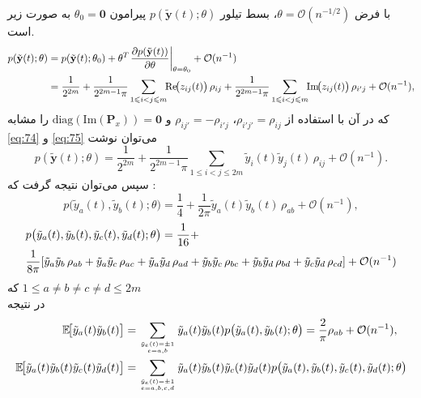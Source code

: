 \begin{اثبات}
	با فرض \(\theta=\mathcal{O}(n^{-1/2})\)، بسط تیلور \(p(\tilde{\mathbf{y}}(t);\theta)\) پیرامون \(\theta_{0}=\mathbf{0}\) به صورت زیر است.
	\begin{align}
		p(\tilde{\mathbf{y}}(t);\theta)
		&= p(\tilde{\mathbf{y}}(t);\theta_{0})
		+ \theta^{T}\!\left.\frac{\partial p(\tilde{\mathbf{y}}(t))}{\partial \theta}\right|_{\theta=\theta_{0}}
		+ \mathcal{O}(n^{-1}) \notag \\
		&= \frac{1}{2^{2m}}
		+ \frac{1}{2^{2m-1}\pi}\sum_{1\le i<j\le m}\!\!\mathrm{Re}\!\big(z_{ij}(t)\big)\,\rho_{ij}
		+ \frac{1}{2^{2m-1}\pi}\sum_{1\le i<j\le m}\!\!\mathrm{Im}\!\big(z_{ij}(t)\big)\,\rho_{i'j}
		+ \mathcal{O}(n^{-1}),
	\end{align}
	که در آن با استفاده از \(\rho_{i'j'}=\rho_{ij}\)، \(\rho_{ij'}=-\rho_{i'j}\) و \(\mathrm{diag}(\mathrm{Im}(\mathbf{P}_{x}))=\mathbf{0}\) را مشابه \eqref{eq:74} و \eqref{eq:75} می‌توان نوشت
	\begin{equation}
		p(\tilde{\mathbf{y}}(t);\theta)
		= \frac{1}{2^{2m}}
		+ \frac{1}{2^{2m-1}\pi}\sum_{1\le i<j\le 2m}\tilde y_i(t)\tilde y_j(t)\,\rho_{ij}
		+ \mathcal{O}(n^{-1}).
	\end{equation}
	سپس می‌توان نتیجه گرفت که :
	\begin{equation}
		p\big(\tilde y_a(t),\tilde y_b(t);\theta\big)
		= \frac{1}{4}+\frac{1}{2\pi}\tilde y_a(t)\tilde y_b(t)\,\rho_{ab}+\mathcal{O}(n^{-1}),
	\end{equation}
	\begin{align}
		&p\big(\tilde y_a(t),\tilde y_b(t),\tilde y_c(t),\tilde y_d(t);\theta\big)
		= \frac{1}{16}
		+ \notag \\
		&\frac{1}{8\pi}\!\left[
		\tilde y_a\tilde y_b\,\rho_{ab}+\tilde y_a\tilde y_c\,\rho_{ac}+\tilde y_a\tilde y_d\,\rho_{ad}
		+\tilde y_b\tilde y_c\,\rho_{bc}+\tilde y_b\tilde y_d\,\rho_{bd}+\tilde y_c\tilde y_d\,\rho_{cd}
		\right] +\mathcal{O}(n^{-1})
	\end{align}
	که 
	$1\leq a \neq b \neq c \neq d \leq 2m$ \\
	در نتیجه
	\begin{align}
		\mathbb{E}\!\big[\tilde y_a(t)\tilde y_b(t)\big]
		&= \sum_{\tilde{y}_e(t)=\pm1 \atop e=a,b} \tilde{y}_a(t)\tilde{y}_b(t)p\big(\tilde y_a(t),\tilde y_b(t);\theta\big)  = \frac{2}{\pi}\rho_{ab}+\mathcal{O}(n^{-1}),\\
		\mathbb{E}\!\big[\tilde y_a(t)\tilde y_b(t)\tilde y_c(t)\tilde y_d(t)\big]
		&=\sum_{\tilde{y}_e(t)=\pm1 \atop e=a,b,c,d} \tilde{y}_a(t)\tilde{y}_b(t)\tilde{y}_c(t)\tilde{y}_d(t)p\big(\tilde y_a(t),\tilde y_b(t),\tilde{y}_c(t),\tilde{y}_d(t);\theta\big) \notag \\

\end{align}
\end{اثبات}
